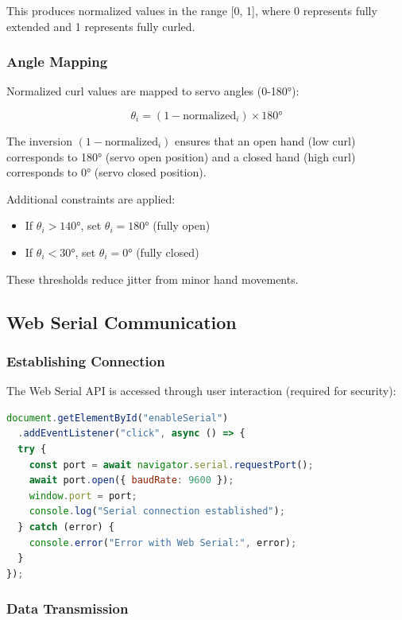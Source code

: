 \documentclass[12pt]{article}
\begin{document}
This produces normalized values in the range [0, 1], where 0 represents fully extended and 1 represents fully curled.

\subsubsection{Angle Mapping}

Normalized curl values are mapped to servo angles (0-180°):

\begin{equation}
    \theta_i = (1 - \text{normalized}_i) \times 180°
\end{equation}

The inversion $(1 - \text{normalized}_i)$ ensures that an open hand (low curl) corresponds to 180° (servo open position) and a closed hand (high curl) corresponds to 0° (servo closed position).

Additional constraints are applied:
\begin{itemize}
    \item If $\theta_i > 140°$, set $\theta_i = 180°$ (fully open)
    \item If $\theta_i < 30°$, set $\theta_i = 0°$ (fully closed)
\end{itemize}

These thresholds reduce jitter from minor hand movements.

\newpage
\subsection{Web Serial Communication}

\subsubsection{Establishing Connection}

The Web Serial API is accessed through user interaction (required for security):

\begin{lstlisting}[language=JavaScript, caption=Serial Port Connection]
document.getElementById("enableSerial")
  .addEventListener("click", async () => {
  try {
    const port = await navigator.serial.requestPort();
    await port.open({ baudRate: 9600 });
    window.port = port;
    console.log("Serial connection established");
  } catch (error) {
    console.error("Error with Web Serial:", error);
  }
});
\end{lstlisting}

\subsubsection{Data Transmission}
\end{document}
